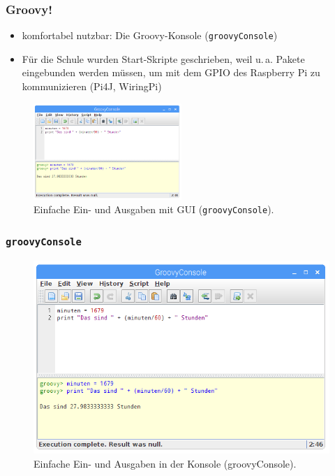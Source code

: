 \documentclass[usenames,dvipsnames]{beamer}
\begin{document}

\begin{frame}
\frametitle{Groovy!}
\begin{itemize}
\item komfortabel nutzbar: Die Groovy-Konsole (\texttt{groovyConsole}) 
\item Für die Schule wurden Start-Skripte geschrieben, weil u.\,a. Pakete eingebunden werden müssen, um mit dem GPIO des Raspberry Pi zu kommunizieren (Pi4J, WiringPi)
\end{itemize}

\begin{figure}[t]
	\centering
	\includegraphics[width=0.5\textwidth]{img/groovyConsole_einfache_eingaben.png}
	\caption{Einfache Ein- und Ausgaben mit GUI (\texttt{groovyConsole}).}
\end{figure}
\end{frame}


\begin{frame}
\frametitle{\texttt{groovyConsole}}
\vspace{-1em}
\begin{figure}[t]
	\centering
	\includegraphics[width=1.0\textwidth]{img/groovyConsole_einfache_eingaben.png}
	\caption{Einfache Ein- und Ausgaben in der Konsole (groovyConsole).}
\end{figure}
\end{frame}
\end{document}
